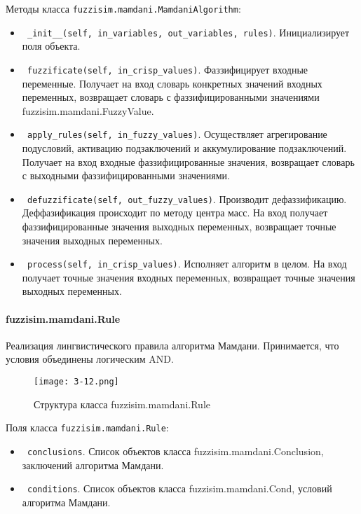 Методы класса \lstinline!fuzzisim.mamdani.MamdaniAlgorithm!:
\begin{itemize}
	\item \lstinline! _init__(self, in_variables, out_variables, rules)!. Инициализирует поля объекта.
	\item \lstinline! fuzzificate(self, in_crisp_values)!. Фаззифицирует входные переменные. Получает на вход словарь конкретных значений входных переменных,  возвращает словарь с фаззифицированными  значениями fuzzisim.mamdani.FuzzyValue.
	\item \lstinline! apply_rules(self, in_fuzzy_values)!. Осуществляет агрегирование подусловий, активацию подзаключений и аккумулирование подзаключений. Получает на вход входные фаззифицированные значения, возвращает словарь с выходными фаззифицированными значениями.
	\item \lstinline! defuzzificate(self, out_fuzzy_values)!. Производит дефаззификацию. Деффазификация происходит по методу центра масс. На вход получает фаззифицированные значения выходных переменных, возвращает точные значения выходных переменных.
	\item \lstinline! process(self, in_crisp_values)!. Исполняет алгоритм в целом. На вход получает точные значения входных переменных, возвращает точные значения выходных переменных.
\end{itemize}

\paragraph{fuzzisim.mamdani.Rule}

Реализация лингвистического правила алгоритма Мамдани. Принимается, что условия объединены логическим AND.



\begin{figure}[ht]
	\centering
	\texttt{[image: 3-12.png]}
	\caption{ Структура класса fuzzisim.mamdani.Rule}
\end{figure}

Поля класса \lstinline!fuzzisim.mamdani.Rule!:
\begin{itemize}
	\item \lstinline! conclusions!. Список объектов класса fuzzisim.mamdani.Conclusion, заключений алгоритма Мамдани.
	\item \lstinline! conditions!.  Список объектов класса fuzzisim.mamdani.Cond, условий алгоритма Мамдани.
\end{itemize}


